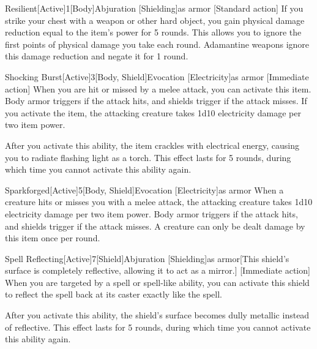         \begin{magicitemdef}{Resilient}[Active]{1}[Body]{Abjuration [Shielding]}{as armor}
            [Standard action] If you strike your chest with a weapon or other hard object, you gain physical damage reduction equal to the item's power for 5 rounds.
            This allows you to ignore the first points of physical damage you take each round.
            Adamantine weapons ignore this damage reduction and negate it for 1 round.
        \end{magicitemdef}

        \begin{magicitemdef}{Shocking Burst}[Active]{3}[Body, Shield]{Evocation [Electricity]}{as armor}
            [Immediate action] When you are hit or missed by a melee attack, you can activate this item.
            Body armor triggers if the attack hits, and shields trigger if the attack misses.
            If you activate the item, the attacking creature takes 1d10 electricity damage per two item power.

            After you activate this ability, the item crackles with electrical energy, causing you to radiate flashing light as a torch.
            This effect lasts for 5 rounds, during which time you cannot activate this ability again.
        \end{magicitemdef}

        \begin{magicitemdef}{Sparkforged}[Active]{5}[Body, Shield]{Evocation [Electricity]}{as armor}
             When a creature hits or misses you with a melee attack, the attacking creature takes 1d10 electricity damage per two item power.
            Body armor triggers if the attack hits, and shields trigger if the attack misses.
            A creature can only be dealt damage by this item once per round.
        \end{magicitemdef}

        \begin{magicitemdef}{Spell Reflecting}[Active]{7}[Shield]{Abjuration [Shielding]}{as armor}[This shield's surface is completely reflective, allowing it to act as a mirror.]
            [Immediate action] When you are targeted by a spell or spell-like ability, you can activate this shield to reflect the spell back at its caster exactly like the  spell.

            After you activate this ability, the shield's surface becomes dully metallic instead of reflective.
            This effect lasts for 5 rounds, during which time you cannot activate this ability again.
        \end{magicitemdef}

